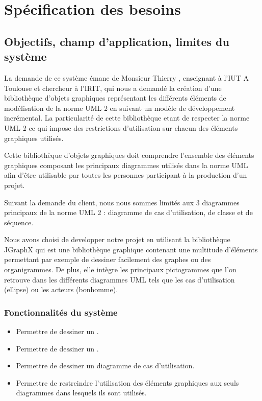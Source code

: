 \documentclass[12pt,a4paper,openany]{report}
\begin{document}
	\maketitle
	\newpage
	\tableofcontents
	\newpage
	\chapter{Spécification des besoins}
	\section{Objectifs, champ d'application, limites du système}
	La demande de ce système émane de Monsieur Thierry , enseignant à l'IUT A Toulouse et chercheur
	à l'IRIT, qui nous a demandé la création d'une bibliothèque d'objets graphiques représentant
	les différents éléments de modélisation de la norme UML 2 en suivant un modèle de développement incrémental.
	La particularité de cette bibliothèque etant de respecter la norme UML 2 ce qui impose des restrictions
	d'utilisation sur chacun des éléments graphiques utilisés.

	Cette bibliothèque d'objets graphiques doit comprendre l'ensemble des éléments graphiques composant
	les principaux diagrammes utilisés dans la norme UML afin d'être utilisable par toutes les personnes
	participant à la production d'un projet. %
	
	Suivant la demande du client, nous nous sommes limités aux 3 diagrammes principaux de la norme UML 2 :
	diagramme de cas d'utilisation, de classe et de séquence.

	Nous avons choisi de developper notre projet en utilisant la bibliothèque JGraphX
	qui est une bibliothèque graphique contenant une multitude d'éléments permettant
	par exemple de dessiner facilement des graphes ou des organigrammes. De plus, elle intègre les principaux 
	pictogrammes que l'on retrouve dans les différents diagrammes UML tels que les cas d'utilisation (ellipse)
	ou les acteurs (bonhomme).

	\subsection{Fonctionnalités du système}
	\begin{itemize}
		\item Permettre de dessiner un .
		\item Permettre de dessiner un .
		\item Permettre de dessiner un diagramme de cas d'utilisation.
		\item Permettre de restreindre l'utilisation des éléments graphiques aux seuls diagrammes dans lesquels ils sont utilisés.
	\end{itemize}
\end{document}

